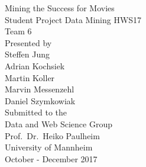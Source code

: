 \documentclass[11pt,titlepage,oneside,openany]{book}
\begin{document}
\begin{titlepage}
	\vspace*{2cm}
  \begin{center}
   {\huge Mining the Success for Movies \\}
   \vspace{2cm} 
   {\Large Student Project Data Mining HWS17\\
   Team 6\\}
   \vspace{2cm}
   {\Large Presented by \\}
   \vspace{0.5cm}
    {Steffen Jung \\
    Adrian Kochsiek \\
    Martin Koller \\
    Marvin Messenzehl \\
    Daniel Szymkowiak \\
   }
   \vspace{1cm} 
   { Submitted to the\\
    Data and Web Science Group\\
    Prof.\ Dr.\ Heiko Paulheim\\
    University of Mannheim\\} \vspace{2cm}
   {October - December 2017}
  \end{center}
\end{titlepage} 

\tableofcontents
\newpage





\newpage










\end{document}
